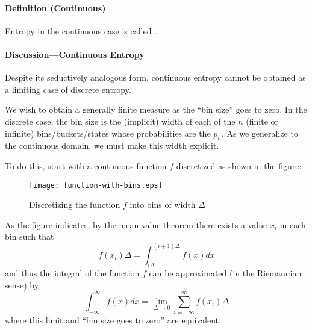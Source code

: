 \documentclass{article}
\begin{document}
\paragraph{Definition (Continuous)}
Entropy in the continuous case is called \emph{}.


\paragraph{Discussion---Continuous Entropy}
Despite its seductively analogous form, continuous entropy cannot be obtained as a limiting case of discrete entropy.

We wish to obtain a generally finite measure as the ``bin size'' goes to zero.  In the discrete case, the bin size is the (implicit) width of each of the $n$ (finite or infinite) bins/buckets/states whose probabilities are the $p_n$.  As we generalize to the continuous domain, we must make this width explicit.

To do this, start with a continuous function $f$ discretized as shown in the figure:
\newline
\begin{figure}[!hbp]
\begin{center}
\caption{Discretizing the function $f$ into bins of width $\Delta$}
\texttt{[image: function-with-bins.eps]}
\end{center}
\end{figure}
As the figure indicates, by the mean-value theorem there exists a value $x_i$ in each bin such that 
\begin{equation}
f(x_i) \Delta = \int_{i\Delta}^{(i+1)\Delta} f(x) dx
\end{equation}
and thus the integral of the function $f$ can be approximated (in the Riemannian sense) by
\begin{equation}
\int_{-\infty}^{\infty} f(x) dx = \lim_{\Delta \to 0} \sum_{i = -\infty}^{\infty} f(x_i) \Delta
\end{equation}
where this limit and ``bin size goes to zero'' are equivalent.
\end{document}
